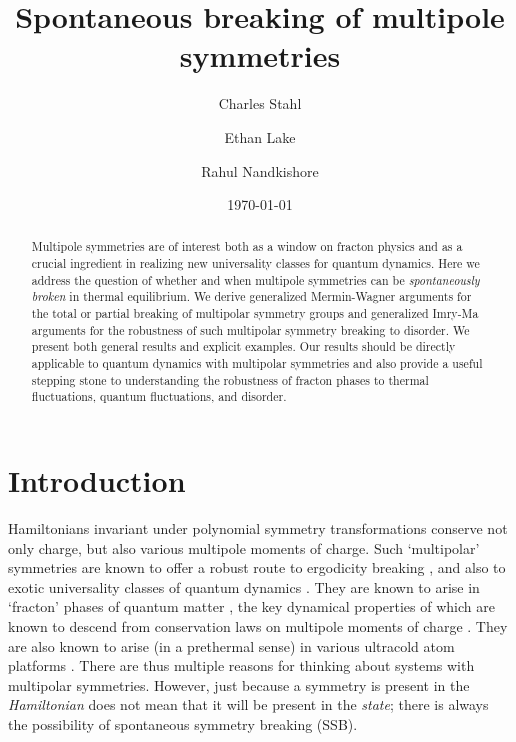 \documentclass[pra,aps,twocolumn, amsfonts,amsmath,amssymb,nofootinbib,superscriptaddress]{revtex4}
\begin{document}
	
\title{Spontaneous breaking of multipole symmetries}
\author{Charles Stahl}
\author{Ethan Lake}
\author{Rahul Nandkishore}


	
\begin{abstract}
Multipole symmetries are of interest both as a window on fracton physics and as a crucial ingredient in realizing new universality classes for quantum dynamics. Here we address the question of whether and when multipole symmetries can be {\it spontaneously broken} in thermal equilibrium. We derive generalized Mermin-Wagner arguments for the total or partial breaking of multipolar symmetry groups and generalized Imry-Ma arguments for the robustness of such multipolar symmetry breaking to disorder. We present both general results and explicit examples. Our results should be directly applicable to quantum dynamics with multipolar symmetries and also provide a useful stepping stone to understanding the robustness of fracton phases to thermal fluctuations, quantum fluctuations, and disorder. 
\end{abstract}
	
\date{\today}
	
\maketitle

\section{Introduction}

Hamiltonians invariant under polynomial symmetry transformations conserve not only charge, but also various multipole moments of charge. Such `multipolar' symmetries are known to offer a robust route to ergodicity breaking \cite{PPN, KHN, Sala, Moudgalya, SLIOM, commutant}, and also to exotic universality classes of quantum dynamics \cite{Iaconis1, GLN, nonabelian, glorioso, MKH, Feldmeier, Iaconis2}. They are known to arise in `fracton' phases of quantum matter \cite{Chamon, Haah, VHF1, VHF2, NH, PretkoRadzihovsky}, the key dynamical properties of which are known to descend from conservation laws on multipole moments of charge \cite{Pretko1, BB,  Gromov2019}. They are also known to arise (in a prethermal sense) in various ultracold atom platforms \cite{KHN, Bakr, Aidelsburger}. There are thus multiple reasons for thinking about systems with multipolar symmetries. However, just because a symmetry is present in the {\it Hamiltonian} does not mean that it will be present in the {\it state}; there is always the possibility of spontaneous symmetry breaking (SSB). 
\end{document}
